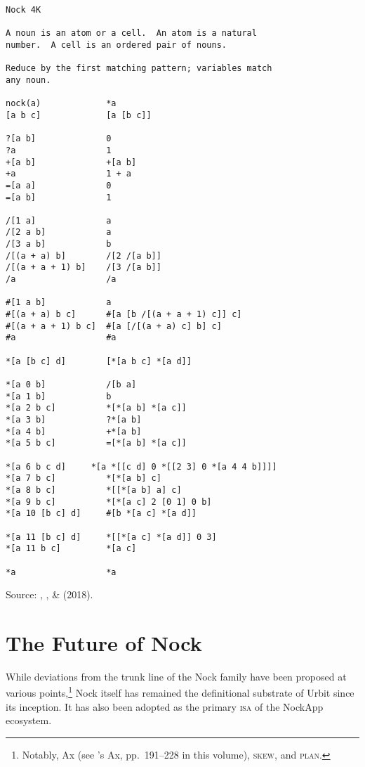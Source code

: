 \documentclass[twoside]{article}
\begin{document}
\begin{lstlisting}[label=lst:nock4k,caption={Nock 4K, \textit{terminus ad quem} 27 September 2018.},style=listingcode]
Nock 4K

A noun is an atom or a cell.  An atom is a natural
number.  A cell is an ordered pair of nouns.

Reduce by the first matching pattern; variables match
any noun.

nock(a)             *a
[a b c]             [a [b c]]

?[a b]              0
?a                  1
+[a b]              +[a b]
+a                  1 + a
=[a a]              0
=[a b]              1

/[1 a]              a
/[2 a b]            a
/[3 a b]            b
/[(a + a) b]        /[2 /[a b]]
/[(a + a + 1) b]    /[3 /[a b]]
/a                  /a

#[1 a b]            a
#[(a + a) b c]      #[a [b /[(a + a + 1) c]] c]
#[(a + a + 1) b c]  #[a [/[(a + a) c] b] c]
#a                  #a

*[a [b c] d]        [*[a b c] *[a d]]

*[a 0 b]            /[b a]
*[a 1 b]            b
*[a 2 b c]          *[*[a b] *[a c]]
*[a 3 b]            ?*[a b]
*[a 4 b]            +*[a b]
*[a 5 b c]          =[*[a b] *[a c]]

*[a 6 b c d]     *[a *[[c d] 0 *[[2 3] 0 *[a 4 4 b]]]]
*[a 7 b c]          *[*[a b] c]
*[a 8 b c]          *[[*[a b] a] c]
*[a 9 b c]          *[*[a c] 2 [0 1] 0 b]
*[a 10 [b c] d]     #[b *[a c] *[a d]]

*[a 11 [b c] d]     *[[*[a c] *[a d]] 0 3]
*[a 11 b c]         *[a c]

*a                  *a
\end{lstlisting}

Source:  , , \&  (2018). %

\section{The Future of Nock}

While deviations from the trunk line of the Nock family have been proposed at various points,\footnote{Notably, Ax (see 's Ax, pp.~191–228 in this volume), \textsc{skew}, and \textsc{plan}.} Nock itself has remained the definitional substrate of Urbit since its inception.  It has also been adopted as the primary \textsc{isa} of the NockApp ecosystem.
\end{document}
